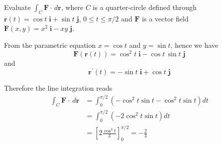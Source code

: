 \documentclass[../../main.tex]{subfiles}
\begin{document}
	\begin{example}
		Evaluate $\int_C \mathbf{F} \cdot \, d\mathbf{r}$, where $C$ is a quarter-circle defined through $\mathbf{r}(t) = \cos t \; \mathbf{i} + \sin t \; \mathbf{j}$, $0 \leq t \leq \pi/2$ and $\mathbf{F}$ is a vector field $\mathbf{F}(x,y) = x^2 \; \mathbf{i} - xy \; \mathbf{j}$.
	\end{example}
	\begin{solution}
		From the parametric equation $x = \cos t$ and $y = \sin t$, hence we have
		\begin{equation*}
			\mathbf{F}(\mathbf{r}(t)) = \cos^2 t \; \mathbf{i} - \cos t \, \sin t \; \mathbf{j}		
		\end{equation*}
		and
		\begin{equation*}
			\mathbf{r}^\prime(t) = -\sin t \; \mathbf{i} + \cos t \; \mathbf{j}		
		\end{equation*}
		
		Therefore the line integration reads
		\begin{align*}
			\int_C \mathbf{F} \cdot \; d\mathbf{r} 	&= \int_0^{\pi/2} \left ( -\cos^2 t \sin t -\cos^2 t \sin t \right ) dt \\
								&= \int_0^{\pi/2} (-2\cos^2 t \sin t) dt \\
								&= \left\lbrack 2 \frac{\cos^3 t}{3}  \right\rbrack_0^{\pi/2} = - \frac{2}{3}
		\end{align*}
	\end{solution}
		
\end{document}
